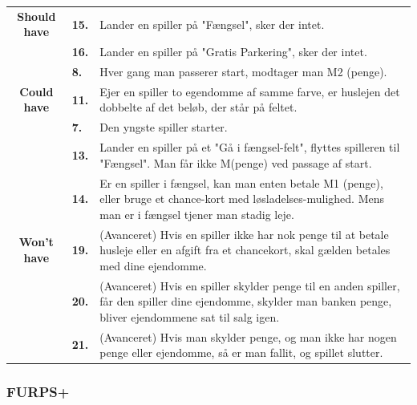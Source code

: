 \begin{center}
\begin{tabular}{ || c | l | p{11.5cm} ||}
    \cline{2-3}
    \textbf{Should have}
    &
    \textbf{15.}
    &
    Lander en spiller på "Fængsel", sker der intet. \\
    
    \cline{2-3}
    &
    \textbf{16.}
    &
    Lander en spiller på "Gratis Parkering", sker der intet. \\
    \hline
    \hline
     &
     \textbf{8.}
     &
     Hver gang man passerer start, modtager man M2 (penge). \\
     
     \cline{2-3}
     \textbf{Could have}
     &
     \textbf{11.}
     &
     Ejer en spiller to egendomme af samme farve, er huslejen det dobbelte af det beløb, der står på feltet. \\

    \hline
    \hline
    &
    \textbf{7.}
    &
    Den yngste spiller starter. \\
    
    \cline{2-3}
    &
    \textbf{13.}
    &
    Lander en spiller på et "Gå i fængsel-felt", flyttes spilleren til "Fængsel". Man får ikke M(penge) ved passage af start. \\

    \cline{2-3}
    &
    \textbf{14.}
    &
    Er en spiller i fængsel, kan man enten betale M1 (penge), eller bruge et chance-kort med løsladelses-mulighed. Mens man er i fængsel tjener man stadig leje. \\

    \cline{2-3}
    \textbf{Won't have}
    &
    \textbf{19.}
    &
    (Avanceret) Hvis en spiller ikke har nok penge til at betale husleje eller en afgift fra et chancekort, skal gælden betales med dine ejendomme.    \\

    \cline{2-3}
    &
    \textbf{20.}
    &
    (Avanceret) Hvis en spiller skylder penge til en anden spiller, får den spiller dine ejendomme, skylder man banken penge, bliver ejendommene sat til salg igen.    \\

    \cline{2-3}
    &
    \textbf{21.}
    &
    (Avanceret) Hvis man skylder penge, og man ikke har nogen penge eller ejendomme, så er man fallit, og spillet slutter.
    \\
    \hline
    \hline
    \end{tabular}
\end{center}

\subsubsection{FURPS+}

